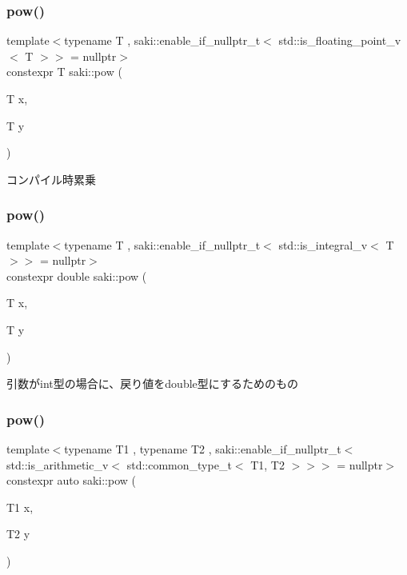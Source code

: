 \mbox{\label{namespacesaki_aa5b66f18d7c8c94b4c50731449ed3240}} 
\subsubsection{\texorpdfstring{pow()}{pow()}\hspace{0.1cm}{\footnotesize\ttfamily [1/3]}}
{\footnotesize\ttfamily template$<$typename T , saki\+::enable\+\_\+if\+\_\+nullptr\+\_\+t$<$ std\+::is\+\_\+floating\+\_\+point\+\_\+v$<$ T $>$$>$  = nullptr$>$ \\
constexpr T saki\+::pow (\begin{DoxyParamCaption}\item[{T}]{x,  }\item[{T}]{y }\end{DoxyParamCaption})}



コンパイル時累乗 

\mbox{\label{namespacesaki_a53b0e93733e85d7c6ab17aea25072536}} 
\subsubsection{\texorpdfstring{pow()}{pow()}\hspace{0.1cm}{\footnotesize\ttfamily [2/3]}}
{\footnotesize\ttfamily template$<$typename T , saki\+::enable\+\_\+if\+\_\+nullptr\+\_\+t$<$ std\+::is\+\_\+integral\+\_\+v$<$ T $>$$>$  = nullptr$>$ \\
constexpr double saki\+::pow (\begin{DoxyParamCaption}\item[{T}]{x,  }\item[{T}]{y }\end{DoxyParamCaption})}



引数がint型の場合に、戻り値をdouble型にするためのもの 

\mbox{\label{namespacesaki_a27bb8324ff45bceda3b301f9f3f417c7}} 
\subsubsection{\texorpdfstring{pow()}{pow()}\hspace{0.1cm}{\footnotesize\ttfamily [3/3]}}
{\footnotesize\ttfamily template$<$typename T1 , typename T2 , saki\+::enable\+\_\+if\+\_\+nullptr\+\_\+t$<$ std\+::is\+\_\+arithmetic\+\_\+v$<$ std\+::common\+\_\+type\+\_\+t$<$ T1, T2 $>$$>$$>$  = nullptr$>$ \\
constexpr auto saki\+::pow (\begin{DoxyParamCaption}\item[{T1}]{x,  }\item[{T2}]{y }\end{DoxyParamCaption})}



